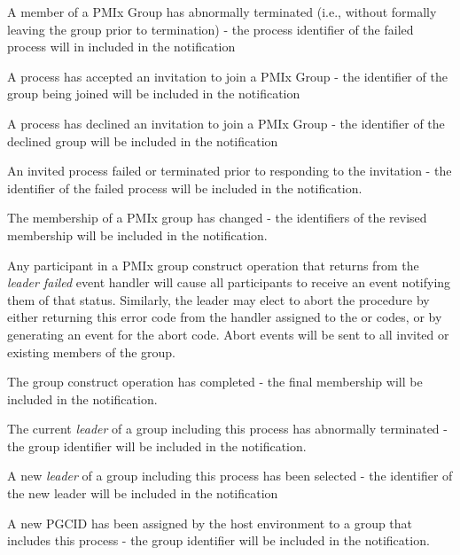 \begin{constantdesc}
%
A member of a \ac{PMIx} Group has abnormally terminated (i.e., without formally leaving the group prior to termination) - the process identifier of the failed process will in included in the notification

%
A process has accepted an invitation to join a \ac{PMIx} Group - the identifier of the group being joined will be included in the notification

%
A process has declined an invitation to join a \ac{PMIx} Group - the identifier of the declined group will be included in the notification

%
An invited process failed or terminated prior to responding to the invitation - the identifier of the failed process will be included in the notification.

%
The membership of a \ac{PMIx} group has changed - the identifiers of the revised membership will be included in the notification.

%
Any participant in a \ac{PMIx} group construct operation that returns  from the \emph{leader failed} event handler will cause all participants to receive an event notifying them of that status. Similarly, the leader may elect to abort the procedure by either returning this error code from the handler assigned to the  or  codes, or by generating an event for the abort code. Abort events will be sent to all invited or existing members of the group.

%
The group construct operation has completed - the final membership will be included in the notification.

%
The current \emph{leader} of a group including this process has abnormally terminated - the group identifier will be included in the notification.

%
A new \emph{leader} of a group including this process has been selected - the identifier of the new leader will be included in the notification

%
A new \ac{PGCID} has been assigned by the host environment to a group that includes this process - the group identifier will be included in the notification.


\end{constantdesc}
